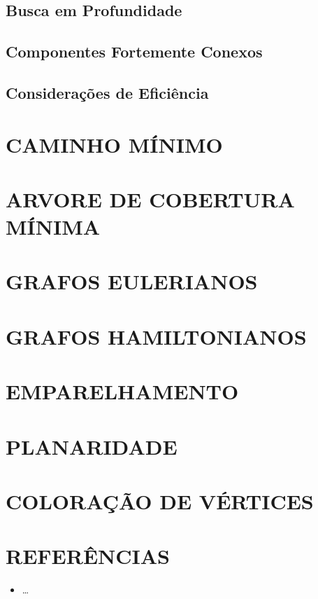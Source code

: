 \documentclass[
12pt,
a4paper,
semrecuonosumario,
sumario = abnt-6027-2012]{report}
\begin{document}
	\section{Busca em Profundidade}\label{sec:buscaProf}

	\section{Componentes Fortemente Conexos}\label{sec:compFC}

	\section{Considerações de Eficiência}\label{sec:eficienciaBusca}

	\chapter{CAMINHO MÍNIMO}\label{cap:caminhoMinimo}


	\chapter{ARVORE DE COBERTURA MÍNIMA}\label{cap:arvCobMinima}


	\chapter{GRAFOS EULERIANOS}\label{cap:grafosEulerianos}


	\chapter{GRAFOS HAMILTONIANOS}\label{cap:grafosHamiltonianos}


	\chapter{EMPARELHAMENTO}\label{cap:emparelhamento}


	\chapter{PLANARIDADE}\label{cap:planaridade}


	\chapter{COLORAÇÃO DE VÉRTICES}\label{cap:coloracaoVertices}


	\clearpage
	\chapter*{REFERÊNCIAS}
	\vspace{-0.5em}
	\begin{itemize}
		\item \dots
	\end{itemize}
\end{document}
